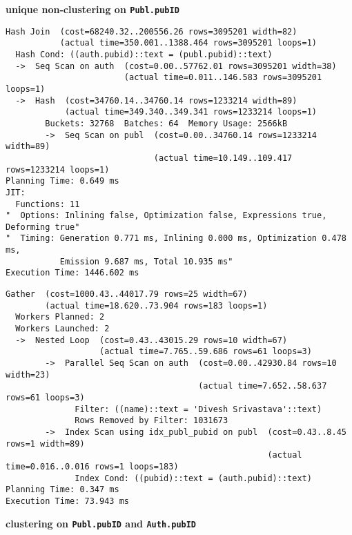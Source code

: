 \documentclass[11pt]{scrartcl}
\begin{document}
\textbf{unique non-clustering on \texttt{Publ.pubID}}

{\small
\parskip0pt\begin{verbatim}
Hash Join  (cost=68240.32..200556.26 rows=3095201 width=82)
           (actual time=350.001..1388.464 rows=3095201 loops=1)
  Hash Cond: ((auth.pubid)::text = (publ.pubid)::text)
  ->  Seq Scan on auth  (cost=0.00..57762.01 rows=3095201 width=38)
                        (actual time=0.011..146.583 rows=3095201 loops=1)
  ->  Hash  (cost=34760.14..34760.14 rows=1233214 width=89)
            (actual time=349.340..349.341 rows=1233214 loops=1)
        Buckets: 32768  Batches: 64  Memory Usage: 2566kB
        ->  Seq Scan on publ  (cost=0.00..34760.14 rows=1233214 width=89)
                              (actual time=10.149..109.417 rows=1233214 loops=1)
Planning Time: 0.649 ms
JIT:
  Functions: 11
"  Options: Inlining false, Optimization false, Expressions true, Deforming true"
"  Timing: Generation 0.771 ms, Inlining 0.000 ms, Optimization 0.478 ms,
           Emission 9.687 ms, Total 10.935 ms"
Execution Time: 1446.602 ms
\end{verbatim}}



{\small
\parskip0pt\begin{verbatim}
Gather  (cost=1000.43..44017.79 rows=25 width=67)
        (actual time=18.620..73.904 rows=183 loops=1)
  Workers Planned: 2
  Workers Launched: 2
  ->  Nested Loop  (cost=0.43..43015.29 rows=10 width=67)
                   (actual time=7.765..59.686 rows=61 loops=3)
        ->  Parallel Seq Scan on auth  (cost=0.00..42930.84 rows=10 width=23)
                                       (actual time=7.652..58.637 rows=61 loops=3)
              Filter: ((name)::text = 'Divesh Srivastava'::text)
              Rows Removed by Filter: 1031673
        ->  Index Scan using idx_publ_pubid on publ  (cost=0.43..8.45 rows=1 width=89)
                                                     (actual time=0.016..0.016 rows=1 loops=183)
              Index Cond: ((pubid)::text = (auth.pubid)::text)
Planning Time: 0.347 ms
Execution Time: 73.943 ms
\end{verbatim}}

\textbf{clustering on \texttt{Publ.pubID} and \texttt{Auth.pubID}}
\end{document}
